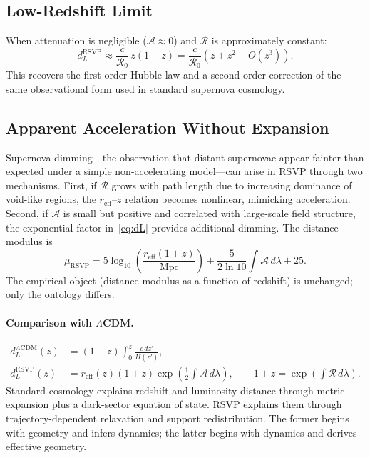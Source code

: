 \documentclass[12pt,a4paper]{article}
\theoremstyle{remark}
\newcommand{\Rcal}{\mathcal{R}}
\newcommand{\Acal}{\mathcal{A}}
\newcommand{\reff}{r_{\mathrm{eff}}}
\newcommand{\dL}{d_L^{\mathrm{RSVP}}}
\begin{document}
\subsection{Low-Redshift Limit}

When attenuation is negligible ($\Acal \approx 0$) and $\Rcal$ is approximately constant:
\begin{equation}
\dL \approx \frac{c}{\Rcal_0}\, z(1+z) = \frac{c}{\Rcal_0}\left(z + z^2 + O(z^3)\right).
\end{equation}
This recovers the first-order Hubble law and a second-order correction of the same observational form used in standard supernova cosmology.

\subsection{Apparent Acceleration Without Expansion}

Supernova dimming---the observation that distant supernovae appear fainter than expected under a simple non-accelerating model---can arise in RSVP through two mechanisms. First, if $\Rcal$ grows with path length due to increasing dominance of void-like regions, the $\reff$--$z$ relation becomes nonlinear, mimicking acceleration. Second, if $\Acal$ is small but positive and correlated with large-scale field structure, the exponential factor in~\eqref{eq:dL} provides additional dimming. The distance modulus is
\begin{equation}
\mu_{\mathrm{RSVP}} = 5\log_{10}\!\left(\frac{\reff(1+z)}{\mathrm{Mpc}}\right) + \frac{5}{2\ln 10}\int\Acal\, d\lambda + 25.
\end{equation}
The empirical object (distance modulus as a function of redshift) is unchanged; only the ontology differs.

\paragraph{Comparison with $\Lambda$CDM.}
\begin{align}
d_L^{\Lambda\mathrm{CDM}}(z) &= (1+z)\int_0^z \frac{c\, dz'}{H(z')}, \\
\dL(z) &= \reff(z)(1+z)\exp\!\left(\tfrac12\int\Acal\, d\lambda\right),
\qquad 1+z = \exp\!\left(\int\Rcal\, d\lambda\right).
\end{align}
Standard cosmology explains redshift and luminosity distance through metric expansion plus a dark-sector equation of state. RSVP explains them through trajectory-dependent relaxation and support redistribution. The former begins with geometry and infers dynamics; the latter begins with dynamics and derives effective geometry.
\end{document}
